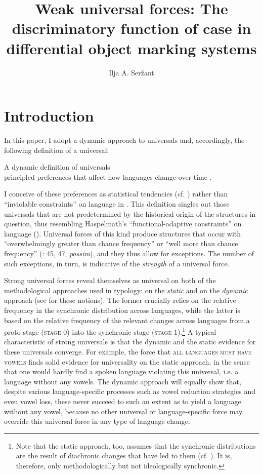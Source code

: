 \documentclass[output=paper]{langsci/langscibook}
\author{Ilja A. Seržant\affiliation{Leipzig University}}
\title{Weak universal forces: The discriminatory function of case in differential object marking systems}
\begin{document}
\maketitle 
 

\section{ Introduction}

In this paper, I adopt a dynamic approach to universals \citep{Greenberg1978} and, accordingly, the following definition of a universal:

\ea A dynamic definition of universals\\
principled preferences that affect how languages change over time \citep[401]{Bickel2011}.
\z

I conceive of these preferences as statistical tendencies (cf. \citealt{Bickel2011}) rather than “inviolable constraints” on language in \citet{Kiparsky2008}. This definition singles out those universals that are not predetermined by the historical origin of the structures in question, thus resembling Haspelmath’s “functional-adaptive constraints” on language (\citealt{Haspelmath2019 [this volume}). Universal forces of this kind produce structures that occur with “overwhelmingly greater than chance frequency” or “well more than chance frequency” (\citealt{Greenberg1963}: 45, 47, \textit{passim}), and they thus allow for exceptions. The number of such exceptions, in turn, is indicative of the \textit{strength} of a universal force. 

Strong universal forces reveal themselves as universal on both of the methodological approaches used in typology: on the \textit{static} and on the \textit{dynamic} approach (see \citealt{Greenberg1969} for these notions). The former crucially relies on the relative frequency in the synchronic distribution across languages, while the latter is based on the relative frequency of the relevant changes across languages from a proto-stage (\textsc{stage} 0) into the synchronic stage (\textsc{stage} 1).\footnote{Note that the static approach, too, assumes that the synchronic distributions are the result of diachronic changes that have led to them (cf. \citealt{Haspelmath2019 [this volume]}). It is, therefore, only methodologically but not ideologically synchronic.} A typical characteristic of strong universals is that the dynamic and the static evidence for these universals converge. For example, the force that \textsc{all languages must have vowels} \citep[19]{Comrie1989} finds solid evidence for universality on the static approach, in the sense that one would hardly find a spoken language violating this universal, i.e. a language without any vowels. The dynamic approach will equally show that, despite various language-specific processes such as vowel reduction strategies and even vowel loss, these never succeed to such an extent as to yield a language without any vowel, because no other universal or language-specific force may override this universal force in any type of language change.  
\end{document}
